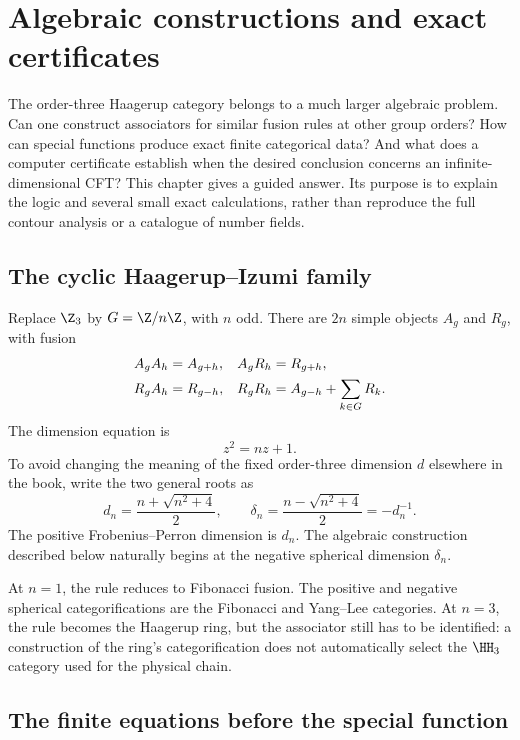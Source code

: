\chapter{Algebraic constructions and exact certificates}
\label{ch:arithmetic}

The order-three Haagerup category belongs to a much larger algebraic
problem.  Can one construct associators for similar fusion rules at
other group orders?  How can special functions produce exact finite
categorical data?  And what does a computer certificate establish
when the desired conclusion concerns an infinite-dimensional CFT?
This chapter gives a guided answer.  Its purpose is to explain the
logic and several small exact calculations, rather than reproduce
the full contour analysis or a catalogue of number fields.

\section{The cyclic Haagerup--Izumi family}

Replace $\Z_3$ by $G=\Z/n\Z$, with $n$ odd.  There are $2n$
simple objects $A_g$ and $R_g$, with fusion
\begin{align}
 A_gA_h&=A_{g+h},&A_gR_h&=R_{g+h},\notag\\
 R_gA_h&=R_{g-h},&R_gR_h&=A_{g-h}+\sum_{k\in G}R_k.
 \label{eq:HI-general-fusion}
\end{align}
The dimension equation is
\[
 z^2=nz+1.
\]
To avoid changing the meaning of the fixed order-three dimension
$d$ elsewhere in the book, write the two general roots as
\begin{equation}
 d_n=\frac{n+\sqrt{n^2+4}}2,\qquad
 \delta_n=\frac{n-\sqrt{n^2+4}}2=-d_n^{-1}.
 \label{eq:HI-general-roots}
\end{equation}
The positive Frobenius--Perron dimension is $d_n$.  The algebraic
construction described below naturally begins at the negative
spherical dimension $\delta_n$.

At $n=1$, the rule reduces to Fibonacci fusion.  The positive and
negative spherical categorifications are the Fibonacci and
Yang--Lee categories.  At $n=3$, the rule becomes the Haagerup
ring, but the associator still has to be identified: a construction
of the ring's categorification does not automatically select the
$\HH_3$ category used for the physical chain.

\section{The finite equations before the special function}

